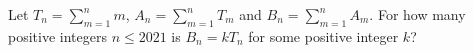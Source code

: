 Let $T_n=\displaystyle\sum_{m=1}^{n}m$, $A_n=\displaystyle\sum_{m=1}^{n}T_m$ and $B_n=\displaystyle\sum_{m=1}^{n}A_m$. For how many positive integers $n\le2021$ is $B_n=kT_n$ for some positive integer $k$?
